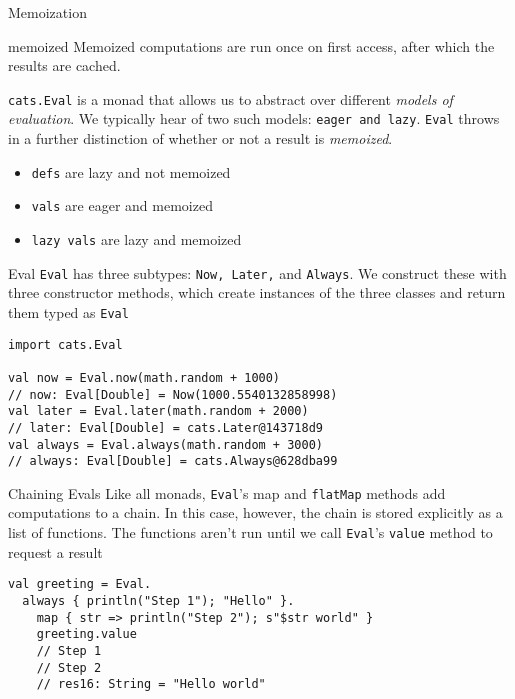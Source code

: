 \documentclass[aspectratio=169]{beamer}
\begin{document}
\begin{frame}{Memoization}
\begin{block}{memoized}
  Memoized computations are run once on first access, after which the results are cached.
\end{block}
\texttt{cats.Eval} is a monad that allows us to abstract over different \textit{models of evaluation}. We typically
hear of two such models: \texttt{eager and lazy}. \texttt{Eval} throws in a further distinction of whether or not a
result is \textit{memoized}.
\begin{itemize}
  \item \texttt{defs} are lazy and not memoized
  \item \texttt{vals} are eager and memoized
  \item \texttt{lazy vals} are lazy and memoized
\end{itemize}
\end{frame}

\begin{frame}[fragile]{Eval}
\texttt{Eval} has three subtypes: \texttt{Now, Later,} and \texttt{Always}. We construct these with three constructor methods,
which create instances of the three classes and return them typed as \texttt{Eval}
\bigskip
\begin{verbatim}
import cats.Eval

val now = Eval.now(math.random + 1000)
// now: Eval[Double] = Now(1000.5540132858998)
val later = Eval.later(math.random + 2000)
// later: Eval[Double] = cats.Later@143718d9
val always = Eval.always(math.random + 3000)
// always: Eval[Double] = cats.Always@628dba99
\end{verbatim}
\end{frame}

\begin{frame}[fragile]{Chaining Evals}
Like all monads, \texttt{Eval}'s map and \texttt{flatMap} methods add computations to a chain. In this case, however,
the chain is stored explicitly as a list of functions. The functions aren’t run until we call \texttt{Eval}'s
\texttt{value} method to request a result
\bigskip
\begin{verbatim}
val greeting = Eval.
  always { println("Step 1"); "Hello" }.
    map { str => println("Step 2"); s"$str world" }
    greeting.value
    // Step 1
    // Step 2
    // res16: String = "Hello world"
\end{verbatim}
\end{frame}
\end{document}
